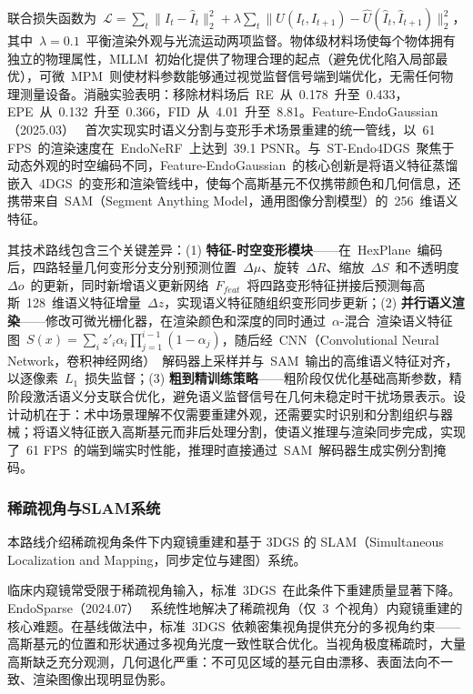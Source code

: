 联合损失函数为~$\mathcal{L} = \sum_t \|I_t - \hat{I}_t\|_2^2 + \lambda \sum_t \|U(I_t, I_{t+1}) - \hat{U}(\hat{I}_t, \hat{I}_{t+1})\|_2^2$，其中~$\lambda = 0.1$~平衡渲染外观与光流运动两项监督。物体级材料场使每个物体拥有独立的物理属性，MLLM~初始化提供了物理合理的起点（避免优化陷入局部最优），可微~MPM~则使材料参数能够通过视觉监督信号端到端优化，无需任何物理测量设备。消融实验表明：移除材料场后~RE~从~0.178~升至~0.433，EPE~从~0.132~升至~0.366，FID~从~4.01~升至~8.81。Feature-EndoGaussian（2025.03）~\cite{2503_06161} 首次实现实时语义分割与变形手术场景重建的统一管线，以~61 FPS~的渲染速度在~EndoNeRF~上达到~39.1 PSNR。与~ST-Endo4DGS~聚焦于动态外观的时空编码不同，Feature-EndoGaussian~的核心创新是将语义特征蒸馏嵌入~4DGS~的变形和渲染管线中，使每个高斯基元不仅携带颜色和几何信息，还携带来自~SAM（Segment Anything Model，通用图像分割模型）的~256~维语义特征。

其技术路线包含三个关键差异：(1) \textbf{特征-时空变形模块}——在~HexPlane~编码后，四路轻量几何变形分支分别预测位置~$\Delta\mu$、旋转~$\Delta R$、缩放~$\Delta S$~和不透明度~$\Delta o$~的更新，同时新增语义更新网络~$F_{feat}$~将四路变形特征拼接后预测每高斯~128~维语义特征增量~$\Delta z$，实现语义特征随组织变形同步更新；(2) \textbf{并行语义渲染}——修改可微光栅化器，在渲染颜色和深度的同时通过~$\alpha$-混合~渲染语义特征图~$S(x) = \sum_i z'_i \alpha_i \prod_{j=1}^{i-1}(1-\alpha_j)$，随后经~CNN（Convolutional Neural Network，卷积神经网络）~解码器上采样并与~SAM~输出的高维语义特征对齐，以逐像素~$L_1$~损失监督；(3) \textbf{粗到精训练策略}——粗阶段仅优化基础高斯参数，精阶段激活语义分支联合优化，避免语义监督信号在几何未稳定时干扰场景表示。设计动机在于：术中场景理解不仅需要重建外观，还需要实时识别和分割组织与器械；将语义特征嵌入高斯基元而非后处理分割，使语义推理与渲染同步完成，实现了~61 FPS~的端到端实时性能，推理时直接通过~SAM~解码器生成实例分割掩码。

\subsubsection{稀疏视角与SLAM系统}

本路线介绍稀疏视角条件下内窥镜重建和基于 3DGS 的 SLAM（Simultaneous Localization and Mapping，同步定位与建图）系统。

临床内窥镜常受限于稀疏视角输入，标准~3DGS~在此条件下重建质量显著下降。EndoSparse（2024.07）~\cite{2407_01029} 系统性地解决了稀疏视角（仅~3~个视角）内窥镜重建的核心难题。在基线做法中，标准~3DGS~依赖密集视角提供充分的多视角约束——高斯基元的位置和形状通过多视角光度一致性联合优化。当视角极度稀疏时，大量高斯缺乏充分观测，几何退化严重：不可见区域的基元自由漂移、表面法向不一致、渲染图像出现明显伪影。


